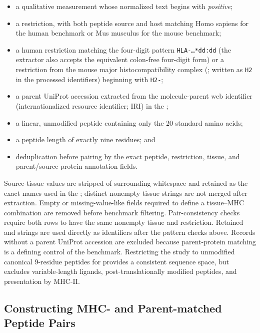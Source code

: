 \begin{itemize}
    \item a qualitative measurement whose normalized text begins with \emph{positive};
    \item a \plainMHCI{} restriction, with both peptide source and host matching Homo sapiens for the human benchmark or Mus musculus for the mouse benchmark;
    \item a human restriction matching the four-digit \plainHLA{} pattern \texttt{HLA-\ldots{}*dd:dd} (the extractor also accepts the equivalent colon-free four-digit form) or a restriction from the mouse major histocompatibility complex (\plainHtwo{}; written as \texttt{H2} in the processed identifiers) beginning with \texttt{H2-};
    \item a parent UniProt accession extracted from the molecule-parent web identifier (internationalized resource identifier; IRI) in the \plainIEDB{};
    \item a linear, unmodified peptide containing only the 20 standard amino acids;
    \item a peptide length of exactly nine residues; and
    \item deduplication before pairing by the exact peptide, restriction, tissue, and parent/source-protein annotation fields.
\end{itemize}

Source-tissue values are stripped of surrounding whitespace and retained as the exact names used in the \plainIEDB{}; distinct nonempty tissue strings are not merged after extraction. Empty or missing-value-like fields required to define a tissue--MHC combination are removed before benchmark filtering. Pair-consistency checks require both rows to have the same nonempty tissue and restriction. Retained \plainHLA{} and \plainHtwo{} strings are used directly as identifiers after the pattern checks above. Records without a parent UniProt accession are excluded because parent-protein matching is a defining control of the benchmark. Restricting the study to unmodified canonical 9-residue peptides for \plainMHCI{} provides a consistent sequence space, but excludes variable-length ligands, post-translationally modified peptides, and presentation by MHC-II.

\subsection{Constructing MHC- and Parent-matched Peptide Pairs}

